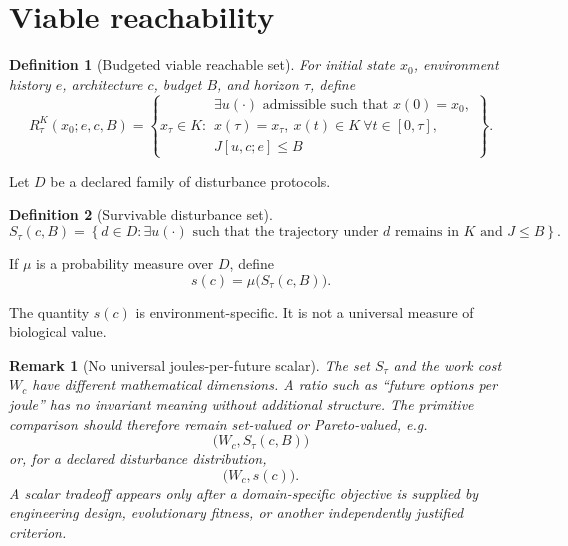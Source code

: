 \documentclass[11pt]{article}
\newtheorem{definition}{Definition}
\newtheorem{remark}{Remark}
\begin{document}
\section{Viable reachability}

\begin{definition}[Budgeted viable reachable set]
For initial state $x_0$, environment history $e$, architecture $c$, budget $B$, and horizon $\tau$, define
\begin{equation}
R^K_\tau(x_0;e,c,B)
=\left\{x_\tau\in K:\begin{array}{l}
\exists u(\cdot)\text{ admissible such that }x(0)=x_0,\\
x(\tau)=x_\tau,\ x(t)\in K\ \forall t\in[0,\tau],\\
J[u,c;e]\le B
\end{array}\right\}.
\end{equation}
\end{definition}

Let $D$ be a declared family of disturbance protocols.

\begin{definition}[Survivable disturbance set]
\begin{equation}
S_\tau(c,B)=\left\{d\in D:\exists u(\cdot)\text{ such that the trajectory under }d
\text{ remains in }K\text{ and }J\le B\right\}.
\end{equation}
\end{definition}

If $\mu$ is a probability measure over $D$, define
\begin{equation}
    s(c)=\mu\bigl(S_\tau(c,B)\bigr).
\end{equation}

The quantity $s(c)$ is environment-specific. It is not a universal measure of biological value.

\begin{remark}[No universal joules-per-future scalar]
The set $S_\tau$ and the work cost $W_c$ have different mathematical dimensions. A ratio such as ``future options per joule'' has no invariant meaning without additional structure. The primitive comparison should therefore remain set-valued or Pareto-valued, e.g.
\begin{equation}
    \bigl(W_c,S_\tau(c,B)\bigr)
\end{equation}
or, for a declared disturbance distribution,
\begin{equation}
    \bigl(W_c,s(c)\bigr).
\end{equation}
A scalar tradeoff appears only after a domain-specific objective is supplied by engineering design, evolutionary fitness, or another independently justified criterion.
\end{remark}
\end{document}
